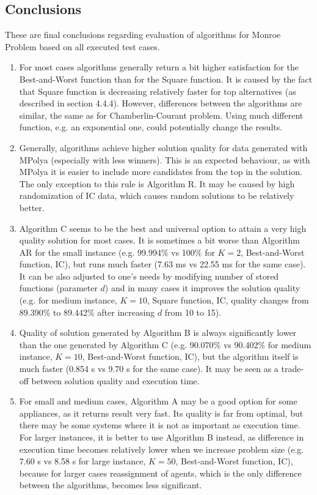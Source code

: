 \subsection{Conclusions}

These are final conclusions regarding evaluation of algorithms for Monroe Problem based on all executed test cases.

\begin{enumerate}
	\item For most cases algorithms generally return a bit higher satisfaction for the Best-and-Worst function than for the Square function. It is caused by the fact that Square function is decreasing relatively faster for top alternatives (as described in section 4.4.4). However, differences between the algorithms are similar, the same as for Chamberlin-Courant problem. Using much different function, e.g. an exponential one, could potentially change the results.
	\item Generally, algorithms achieve higher solution quality for data generated with MPolya (especially with less winners). This is an expected behaviour, as with MPolya it is easier to include more candidates from the top in the solution. The only exception to this rule is Algorithm R. It may be caused by high randomization of IC data, which causes random solutions to be relatively better.
	\item Algorithm C seems to be the best and universal option to attain a very high quality solution for most cases. It is sometimes a bit worse than Algorithm AR for the small instance (e.g. 99.994\% vs 100\% for $K = 2$, Best-and-Worst function, IC), but runs much faster (7.63 ms vs 22.55 ms for the same case). It can be also adjusted to one's needs by modifying number of stored functions (parameter $d$) and in many cases it improves the solution quality (e.g. for medium instance, $K = 10$, Square function, IC, quality changes from 89.390\% to 89.442\% after increasing $d$ from 10 to 15).
	\item Quality of solution generated by Algorithm B is always significantly lower than the one generated by Algorithm C (e.g. 90.070\% vs 90.402\% for medium instance, $K = 10$, Best-and-Worst function, IC), but the algorithm itself is much faster (0.854 s vs 9.70 s for the same case). It may be seen as a trade-off between solution quality and execution time.
	\item For small and medium cases, Algorithm A may be a good option for some appliances, as it returns result very fast. Its quality is far from optimal, but there may be some systems where it is not as important as execution time. For larger instances, it is better to use Algorithm B instead, as difference in execution time becomes relatively lower when we increase problem size (e.g. 7.60 s vs 8.58 s for large instance, $K = 50$, Best-and-Worst function, IC), because for larger cases reassignment of agents, which is the only difference between the algorithms, becomes less significant.

\end{enumerate}
